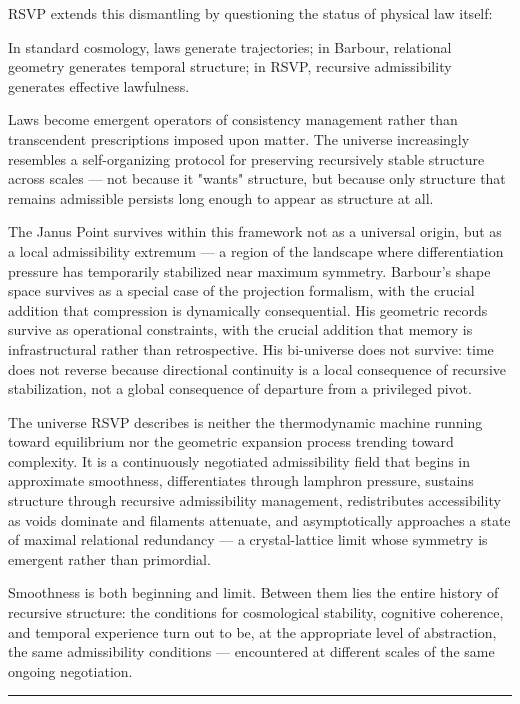 \documentclass[12pt, a4paper]{article}
\begin{document}
RSVP extends this dismantling by questioning the status of physical law
itself:

In standard cosmology, laws generate trajectories; in Barbour,
relational geometry generates temporal structure; in RSVP, recursive
admissibility generates effective lawfulness.

Laws become emergent operators of consistency management rather than
transcendent prescriptions imposed upon matter. The universe increasingly
resembles a self-organizing protocol for preserving recursively stable
structure across scales — not because it "wants" structure, but because
only structure that remains admissible persists long enough to appear
as structure at all.

The Janus Point survives within this framework not as a universal origin,
but as a local admissibility extremum — a region of the landscape where
differentiation pressure has temporarily stabilized near maximum symmetry.
Barbour's shape space survives as a special case of the projection
formalism, with the crucial addition that compression is dynamically
consequential. His geometric records survive as operational constraints,
with the crucial addition that memory is infrastructural rather than
retrospective. His bi-universe does not survive: time does not reverse
because directional continuity is a local consequence of recursive
stabilization, not a global consequence of departure from a privileged pivot.

The universe RSVP describes is neither the thermodynamic machine running
toward equilibrium nor the geometric expansion process trending toward
complexity. It is a continuously negotiated admissibility field that begins
in approximate smoothness, differentiates through lamphron pressure, sustains
structure through recursive admissibility management, redistributes
accessibility as voids dominate and filaments attenuate, and asymptotically
approaches a state of maximal relational redundancy — a crystal-lattice
limit whose symmetry is emergent rather than primordial.

Smoothness is both beginning and limit. Between them lies the entire history
of recursive structure: the conditions for cosmological stability, cognitive
coherence, and temporal experience turn out to be, at the appropriate level
of abstraction, the same admissibility conditions — encountered at different
scales of the same ongoing negotiation.

\bigskip
\begin{center}
  \rule{60mm}{0.3pt}
\end{center}
\end{document}
